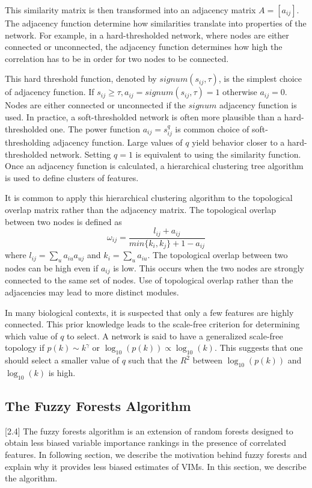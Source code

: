 \documentclass[article,shortnames]{jss}
\begin{document}
This similarity matrix is then transformed into an adjacency matrix $A=[a_{ij}]$.  The adjacency function determine how similarities translate
into properties of the network.  For example, in a hard-thresholded network, where nodes are either connected or unconnected,
the adjacency function determines how high the correlation has to be in order for two nodes to be connected.

This hard threshold function, denoted by $signum(s_{ij},\tau)$,  is the simplest choice of adjacency function.   
If $s_{ij} \geq \tau, a_{ij}=signum(s_{ij},\tau)=1$ otherwise $a_{ij}=0$.  Nodes are either connected or 
unconnected if the $signum$ adjacency function is used.  In practice, a soft-thresholded network is often more plausible than a 
hard-thresholded one.  The power function $a_{ij}=s_{ij}^{q}$ is common choice of soft-thresholding adjacency function.  Large values
of $q$ yield behavior closer to a hard-thresholded network.  Setting $q=1$ is equivalent to using the similarity function.
Once an adjacency function is calculated, a hierarchical clustering tree algorithm 
is used to define clusters of features.

It is common to apply this hierarchical clustering algorithm to the topological overlap matrix rather than the adjacency matrix.  The topological
overlap between two nodes is defined as 
\begin{equation}
\omega_{ij} = \frac{l_{ij} + a_{ij}}{min\{k_{i},k_{j}\} + 1 - a_{ij}}
\end{equation} 
where $l_{ij}=\sum_{u}a_{iu}a_{uj}$ and $k_{i}=\sum_{u}a_{iu}$\citep{horvath2011weighted}.  The topological overlap between two nodes can be high even if $a_{ij}$ is low.
This occurs when the two nodes are strongly connected to the same set of nodes.  Use of topological overlap rather
than the adjacencies may lead to more distinct modules\citep{zhang2005general}.

In many biological contexts, it is suspected that only a few features are highly connected.  This prior knowledge leads to the scale-free criterion for
determining which value of $q$ to select.  A network is said to have a generalized scale-free topology if $p(k) \sim k^{\gamma}$ or
 $\log_{10}(p(k)) \propto \log_{10}(k)$\citep{zhang2005general}.  This suggests that one should select a smaller value of $q$ such that the $R^{2}$ between 
  $\log_{10}(p(k))$ and $\log_{10}(k)$ is high.
  
\subsection{The Fuzzy Forests Algorithm}[2.4]
The fuzzy forests algorithm is an extension of random forests designed to obtain less biased variable importance rankings in the presence
of correlated features.  In following section, we describe the motivation behind fuzzy forests and explain why it
provides less biased estimates of VIMs.  In this section, we describe the algorithm.
\end{document}
